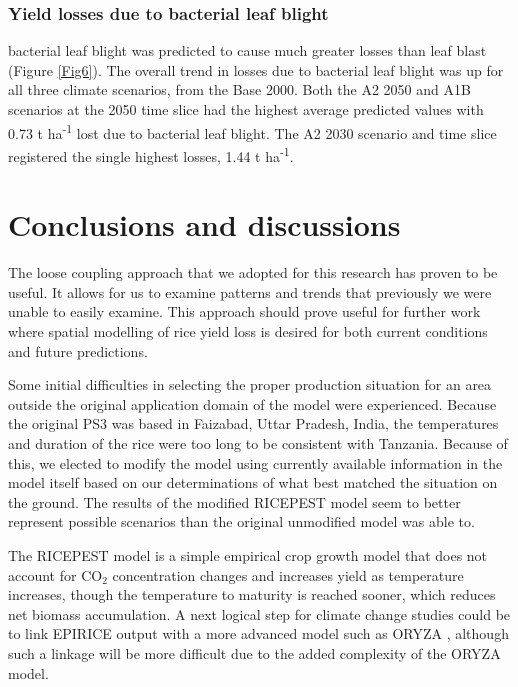     \subsubsection{Yield losses due to bacterial leaf blight}
    \label{bb_yield_losses}
    bacterial leaf blight was predicted to cause much greater losses than leaf blast (Figure \ref{Fig6}). The overall trend in losses due to bacterial leaf blight was up for all three climate scenarios, from the Base 2000. Both the A2 2050 and A1B scenarios at the 2050 time slice had the highest average predicted values with 0.73 t ha\textsuperscript{-1} lost due to bacterial leaf blight. The A2 2030 scenario and time slice registered the single highest losses, 1.44 t ha\textsuperscript{-1}.
        
    \section{Conclusions and discussions}
    \label{conclusions}
    The loose coupling approach that we adopted for this research has proven to be useful. It allows for us to examine patterns and trends that previously we were unable to easily examine. This approach should prove useful for further work where spatial modelling of rice yield loss is desired for both current conditions and future predictions.
    
    Some initial difficulties in selecting the proper production situation for an area outside the original application domain of the model were experienced. Because the original PS3 was based in Faizabad, Uttar Pradesh, India, the temperatures and duration of the rice were too long to be consistent with Tanzania. Because of this, we elected to modify the model using currently available information in the model itself based on our determinations of what best matched the situation on the ground. The results of the modified RICEPEST model seem to better represent possible scenarios than the original unmodified model was able to.
    
    The RICEPEST model is a simple empirical crop growth model that does not account for CO$_2$ concentration changes and increases yield as temperature increases, though the temperature to maturity is reached sooner, which reduces net biomass accumulation. A next logical step for climate change studies could be to link EPIRICE output with a more advanced model such as ORYZA \citep{Oryza}, although such a linkage will be more difficult due to the added complexity of the ORYZA model.
    
